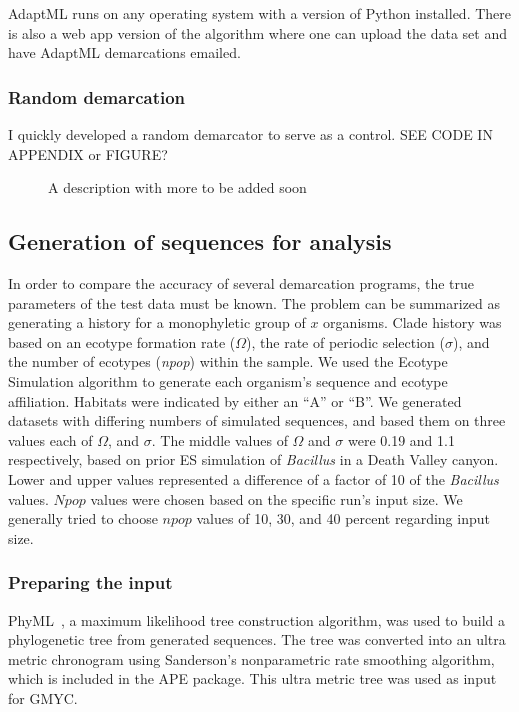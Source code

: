 AdaptML runs on any operating system with a  version of Python installed. There is also a web app version of the algorithm where one can upload the data set and have AdaptML demarcations emailed.

\subsubsection*{Random demarcation}
I quickly developed a random demarcator to serve as a control. SEE CODE IN APPENDIX or FIGURE?

\begin{figure}[h!]
\centering
\noindent{}
\caption[Python code showing a random demarcator.]{A description with more to be added soon}
\label{code:RandomDemarcating}
\end{figure}


\subsection*{Generation of sequences for analysis}
In order to compare the accuracy of several demarcation programs, the true parameters of the test data must be known.
The problem can be summarized as generating a history for a monophyletic group of $x$ organisms.
Clade history was based on an ecotype formation rate ($\Omega$), the rate of periodic selection ($\sigma$), and the number of ecotypes (\emph{npop}) within the sample.
We used the Ecotype Simulation algorithm to generate each organism's sequence and ecotype affiliation.
Habitats were indicated by either an ``A'' or ``B''.
We generated datasets with differing numbers of simulated sequences, and based them on three values each of $\Omega$, and $\sigma$.
The middle values of $\Omega$ and $\sigma$ were 0.19 and 1.1 respectively, based on prior ES simulation of \emph{Bacillus} in a Death Valley canyon.
Lower and upper values represented a difference of a factor of 10 of the \emph{Bacillus} values.
$Npop$ values were chosen based on the specific run's input size.
We generally tried to choose $npop$ values of 10, 30, and 40 percent regarding input size.

\subsubsection*{Preparing the input}
PhyML~\cite{guindon2010new}, a maximum likelihood tree construction algorithm, was used to build a phylogenetic tree from generated sequences.
The tree was converted into an ultra metric chronogram using Sanderson's nonparametric rate smoothing algorithm, which is included in the APE package.
This ultra metric tree was used as input for GMYC.

